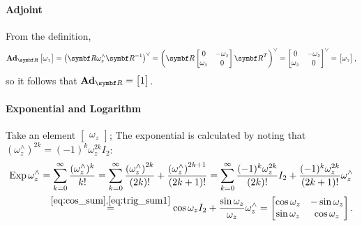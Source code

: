 \paragraph{Adjoint}

From the definition,
\begin{equation}
  \bAd_{\bR} \begin{bmatrix} \omega_{z} \end{bmatrix}
  = \left( \bR \omega_{z}^{\wedge} \bR^{-1} \right)^{\vee} = \left(\bR \begin{bmatrix} 0 & -\omega_{z} \\ \omega_{z} & 0 \end{bmatrix} \bR^T \right)^{\vee} = \begin{bmatrix} 0 & -\omega_{z} \\ \omega_{z} & 0 \end{bmatrix}^{\vee} = \begin{bmatrix} \omega_{z} \end{bmatrix},
\end{equation}
so it follows that $\bAd_{\bR} = \begin{bmatrix} 1 \end{bmatrix}$.

\paragraph{Exponential and Logarithm}

Take an element $\begin{bmatrix}\omega_z\end{bmatrix}$; The exponential is calculated by noting that $(\omega_z^\wedge)^{2k} = (-1)^{k} \omega_z^{2k} I_2$:
\begin{equation}
  \begin{aligned}
    \operatorname{Exp} {\omega_z^\wedge} = \sum_{k = 0}^{\infty} \frac{(\omega_z^\wedge)^k}{k!} = \sum_{k = 0}^{\infty} \frac{\left(\omega_{z}^{\wedge}\right)^{2k}}{(2k)!} + \frac{\left(\omega_{z}^{\wedge}\right)^{2k + 1}}{(2k + 1)!} = \sum_{k = 0}^{\infty} \frac{(-1)^{k} \omega_{z}^{2k}}{(2k)!} I_{2} + \frac{(-1)^{k} \omega_{z}^{2k}}{(2k + 1)!} \omega_{z}^{\wedge} \\
    \overset{\eqref{eq:cos_sum}, \eqref{eq:trig_sum1}}= \cos \omega_z I_2 + \frac{\sin \omega_{z}}{\omega_{z}} \omega_z^\wedge = \begin{bmatrix} \cos \omega_z & - \sin \omega_z \\ \sin \omega_z & \cos \omega_z \end{bmatrix}.
  \end{aligned}
\end{equation}

